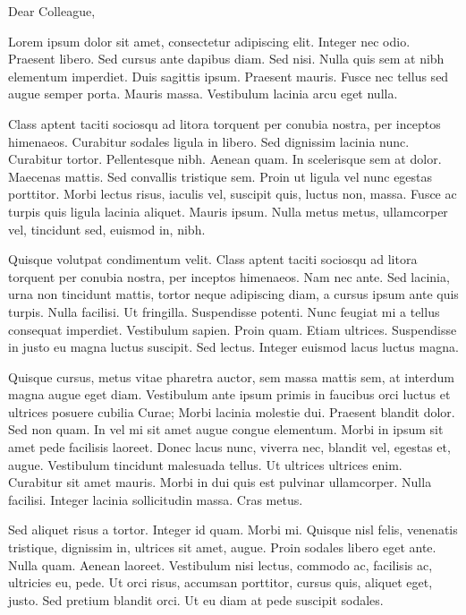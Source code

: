 \documentclass[10pt]{deptletter}
\begin{document}

\opening{Dear Colleague,}

Lorem ipsum dolor sit amet, consectetur adipiscing elit. Integer nec odio.
Praesent libero. Sed cursus ante dapibus diam. Sed nisi. Nulla quis sem at
nibh elementum imperdiet. Duis sagittis ipsum. Praesent mauris. Fusce nec
tellus sed augue semper porta. Mauris massa. Vestibulum lacinia arcu eget
nulla. 

Class aptent taciti sociosqu ad litora torquent per conubia nostra, per
inceptos himenaeos. Curabitur sodales ligula in libero. Sed dignissim
lacinia nunc. Curabitur tortor. Pellentesque nibh. Aenean quam. In
scelerisque sem at dolor. Maecenas mattis. Sed convallis tristique sem.
Proin ut ligula vel nunc egestas porttitor. Morbi lectus risus, iaculis
vel, suscipit quis, luctus non, massa. Fusce ac turpis quis ligula lacinia
aliquet. Mauris ipsum. Nulla metus metus, ullamcorper vel, tincidunt sed,
euismod in, nibh. 

Quisque volutpat condimentum velit. Class aptent taciti sociosqu ad litora
torquent per conubia nostra, per inceptos himenaeos. Nam nec ante. Sed
lacinia, urna non tincidunt mattis, tortor neque adipiscing diam, a cursus
ipsum ante quis turpis. Nulla facilisi. Ut fringilla. Suspendisse potenti.
Nunc feugiat mi a tellus consequat imperdiet. Vestibulum sapien. Proin
quam. Etiam ultrices. Suspendisse in justo eu magna luctus suscipit. Sed
lectus. Integer euismod lacus luctus magna. 

Quisque cursus, metus vitae pharetra auctor, sem massa mattis sem, at
interdum magna augue eget diam. Vestibulum ante ipsum primis in faucibus
orci luctus et ultrices posuere cubilia Curae; Morbi lacinia molestie dui.
Praesent blandit dolor. Sed non quam. In vel mi sit amet augue congue
elementum. Morbi in ipsum sit amet pede facilisis laoreet. Donec lacus
nunc, viverra nec, blandit vel, egestas et, augue. Vestibulum tincidunt
malesuada tellus. Ut ultrices ultrices enim. Curabitur sit amet mauris.
Morbi in dui quis est pulvinar ullamcorper. Nulla facilisi. Integer lacinia
sollicitudin massa. Cras metus. 

Sed aliquet risus a tortor. Integer id quam. Morbi mi. Quisque nisl felis,
venenatis tristique, dignissim in, ultrices sit amet, augue. Proin sodales
libero eget ante. Nulla quam. Aenean laoreet. Vestibulum nisi lectus,
commodo ac, facilisis ac, ultricies eu, pede. Ut orci risus, accumsan
porttitor, cursus quis, aliquet eget, justo. Sed pretium blandit orci. Ut
eu diam at pede suscipit sodales. 
\end{document}
